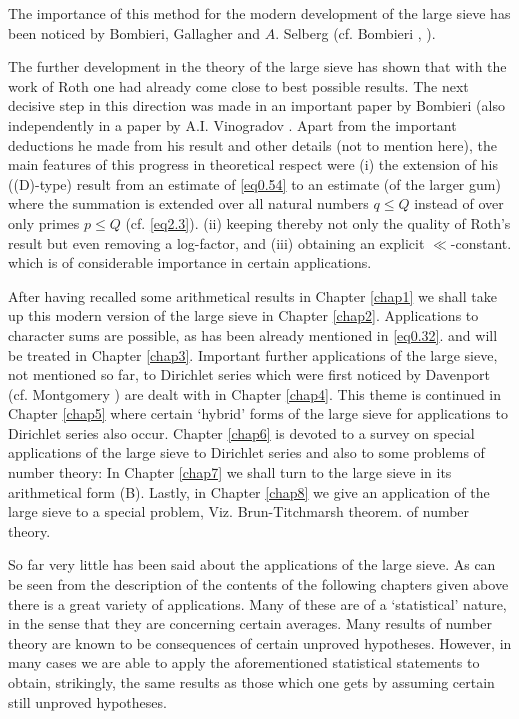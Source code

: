 The importance of this method for the modern development of the large
sieve has been noticed by Bombieri, Gallagher and $A$. Selberg
(cf. Bombieri \cite{key3}, \cite{key4}). 

The further development in the theory of the large sieve has shown
that with the work of Roth one had already come close to best
possible results. The next decisive step in this direction was made in
an important paper by Bombieri \cite{key1} (also independently in a paper by
A.I.  Vinogradov \cite{key1}. Apart from the important deductions he
made from his result and other details (not to mention here), the main
features  of this progress in theoretical respect were (i) the
extension of his ((D)-type) result from an  estimate of \eqref{eq0.54}
to an estimate (of the larger gum) where\pageoriginale 
the summation is extended over
all  natural numbers $q \leq Q$ instead of over only primes $p\leq Q$
(cf. \eqref{eq2.3}). (ii) keeping thereby not only the quality of Roth's
result but even removing a log-factor, and (iii) obtaining an
explicit $\ll$-constant. which is of considerable importance in
certain applications. 

After having recalled some arithmetical results in Chapter \ref{chap1}  we
shall take up this modern version of the large sieve in Chapter
\ref{chap2}. Applications to character sums are possible, as has  been
already mentioned in \eqref{eq0.32}. and will be  treated in Chapter
\ref{chap3}. Important further applications of the large sieve, not mentioned
so far, to Dirichlet series which were first noticed by Davenport
(cf. Montgomery \cite{key2})  are dealt with in Chapter
\ref{chap4}. This theme is 
continued in Chapter \ref{chap5} where certain `hybrid' forms of the large
sieve for applications to Dirichlet series also occur. Chapter \ref{chap6} is
devoted to a survey on special applications of the large sieve   to
Dirichlet series and also to some problems of number theory: In
Chapter \ref{chap7} we shall turn to the large sieve in its
arithmetical form (B). Lastly, in Chapter \ref{chap8} we give an
application of the large 
sieve to a special problem, Viz. Brun-Titchmarsh theorem. of number
theory. 

So far very little has been said about the applications of the large
sieve. As can be seen from the description of the contents of the
following chapters given above  there is a great variety of
applications. Many of these are of a `statistical' nature, in the
sense that they are concerning certain averages. Many results of
number theory are known to be consequences of certain unproved
hypotheses. However, in many cases we are able to apply the
aforementioned statistical statements  to obtain, strikingly, the same
results as those which one gets by assuming certain still unproved
hypotheses. 
  
